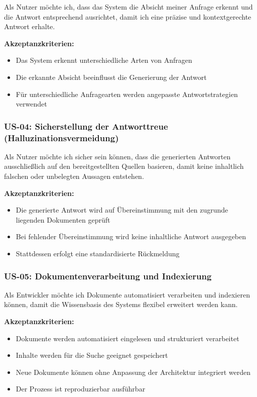 Als Nutzer möchte ich, dass das System die Absicht meiner Anfrage erkennt und die Antwort entsprechend ausrichtet, damit ich eine präzise und kontextgerechte Antwort erhalte.

\textbf{Akzeptanzkriterien:}
\begin{itemize}
\item Das System erkennt unterschiedliche Arten von Anfragen
\item Die erkannte Absicht beeinflusst die Generierung der Antwort
\item Für unterschiedliche Anfragearten werden angepasste Antwortstrategien verwendet
\end{itemize}

\subsubsection*{US-04: Sicherstellung der Antworttreue (Halluzinationsvermeidung)}

Als Nutzer möchte ich sicher sein können, dass die generierten Antworten ausschließlich auf den bereitgestellten Quellen basieren, damit keine inhaltlich falschen oder unbelegten Aussagen entstehen.

\textbf{Akzeptanzkriterien:}
\begin{itemize}
\item Die generierte Antwort wird auf Übereinstimmung mit den zugrunde liegenden Dokumenten geprüft
\item Bei fehlender Übereinstimmung wird keine inhaltliche Antwort ausgegeben
\item Stattdessen erfolgt eine standardisierte Rückmeldung
\end{itemize}

\subsubsection*{US-05: Dokumentenverarbeitung und Indexierung}

Als Entwickler möchte ich Dokumente automatisiert verarbeiten und indexieren können, damit die Wissensbasis des Systems flexibel erweitert werden kann.

\textbf{Akzeptanzkriterien:}
\begin{itemize}
\item Dokumente werden automatisiert eingelesen und strukturiert verarbeitet
\item Inhalte werden für die Suche geeignet gespeichert
\item Neue Dokumente können ohne Anpassung der Architektur integriert werden
\item Der Prozess ist reproduzierbar ausführbar
\end{itemize}

